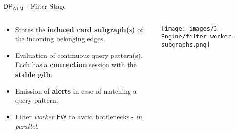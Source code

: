 \begin{comment}
        \node (down4) at (5.7, -2.55);
        \draw [[-{Stealth[length=4mm]}, visible on=<2->, alt=<2>{red}{black}] (4) to["log" '] (down4);
        
        \node (right4) at (7.4, 0);
        \draw [[-{Stealth[length=4mm]}, visible on=<2->, red] (4) to["Alerts"] (right4);
    \end{tikzpicture}
    \end{adjustwidth}
\end{frame}
\end{comment}

\begin{frame}{$\mathsf{DP_{ATM}}$ - Filter Stage}
    \begin{columns} %
        \begin{column}{0.5\textwidth}
            \begin{itemize}
                \item Stores the \textbf{induced card subgraph(s)} of the incoming belonging edges.
                \item Evaluation of continuous query pattern(s). Each has a \textbf{connection} session with the \textbf{stable gdb}.
                \item Emission of \textbf{alerts} in case of matching a query pattern.
                \item Filter \emph{worker} $\mathsf{FW}$ to avoid bottlenecks - \emph{in parallel}.
            \end{itemize}
        \end{column}

        \begin{column}{0.6\textwidth}
            \centering
            \texttt{[image: images/3-Engine/filter-worker-subgraphs.png]}
        \end{column}
    \end{columns}
\end{frame}

